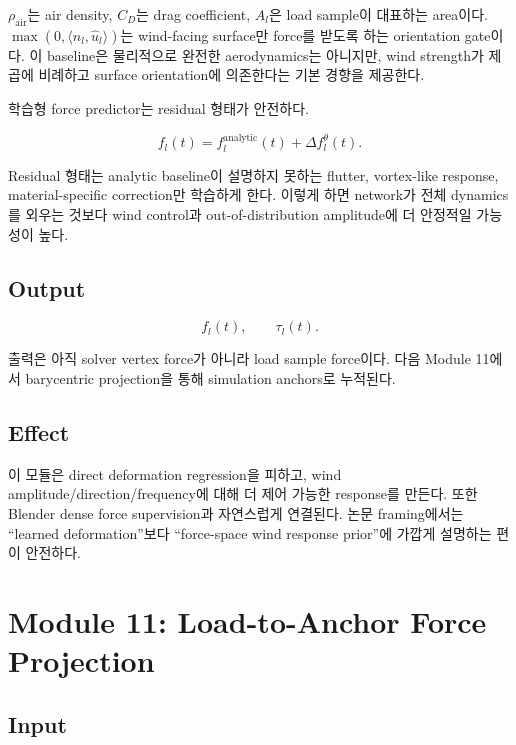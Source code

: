 \documentclass[11pt,a4paper]{article}
\begin{document}
$\rho_{\mathrm{air}}$는 air density, $C_D$는 drag coefficient, $A_l$은 load sample이 대표하는 area이다.
$\max(0,\langle n_l,\hat{u}_l\rangle)$는 wind-facing surface만 force를 받도록 하는 orientation gate이다.
이 baseline은 물리적으로 완전한 aerodynamics는 아니지만, wind strength가 제곱에 비례하고 surface orientation에 의존한다는 기본 경향을 제공한다.

학습형 force predictor는 residual 형태가 안전하다.

\begin{equation}
f_l(t)=f_l^{\mathrm{analytic}}(t)+\Delta f_l^\theta(t).
\end{equation}

Residual 형태는 analytic baseline이 설명하지 못하는 flutter, vortex-like response, material-specific correction만 학습하게 한다.
이렇게 하면 network가 전체 dynamics를 외우는 것보다 wind control과 out-of-distribution amplitude에 더 안정적일 가능성이 높다.

\subsection*{Output}

\begin{equation}
f_l(t),\qquad \tau_l(t).
\end{equation}

출력은 아직 solver vertex force가 아니라 load sample force이다.
다음 Module 11에서 barycentric projection을 통해 simulation anchors로 누적된다.

\subsection*{Effect}

이 모듈은 direct deformation regression을 피하고, wind amplitude/direction/frequency에 대해 더 제어 가능한 response를 만든다. 또한 Blender dense force supervision과 자연스럽게 연결된다.
논문 framing에서는 ``learned deformation''보다 ``force-space wind response prior''에 가깝게 설명하는 편이 안전하다.

\section{Module 11: Load-to-Anchor Force Projection}

\subsection*{Input}
\end{document}
